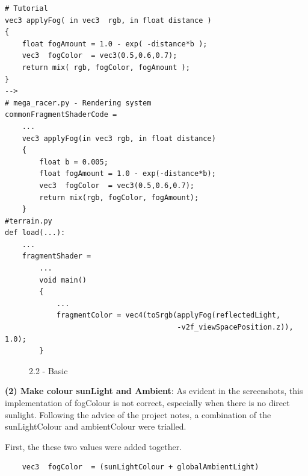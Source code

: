 \documentclass[a4 paper, 12pt]{article}
\begin{document}
    \begin{lstlisting}
# Tutorial
vec3 applyFog( in vec3  rgb, in float distance )
{
    float fogAmount = 1.0 - exp( -distance*b );
    vec3  fogColor  = vec3(0.5,0.6,0.7);
    return mix( rgb, fogColor, fogAmount );
}
-->
# mega_racer.py - Rendering system
commonFragmentShaderCode = 
    ...
    vec3 applyFog(in vec3 rgb, in float distance)
    {
        float b = 0.005;
        float fogAmount = 1.0 - exp(-distance*b);
        vec3  fogColor  = vec3(0.5,0.6,0.7);
        return mix(rgb, fogColor, fogAmount);
    }
#terrain.py
def load(...):
    ...
    fragmentShader = 
        ...
        void main()
        {
            ...
            fragmentColor = vec4(toSrgb(applyFog(reflectedLight, 
                                        -v2f_viewSpacePosition.z)), 1.0);
        }
    \end{lstlisting} 

\begin{figure} [H]
    \caption{2.2 - Basic}   
\end{figure}


\textbf{(2) Make colour sunLight and Ambient}: As evident in the screenshots, this implementation of fogColour is not correct, especially when there is no direct sunlight. Following the advice of the project notes, a combination of the sunLightColour and ambientColour were trialled. 

First, the these two values were added together.
\begin{lstlisting}
    vec3  fogColor  = (sunLightColour + globalAmbientLight)
\end{lstlisting} 
\end{document}
